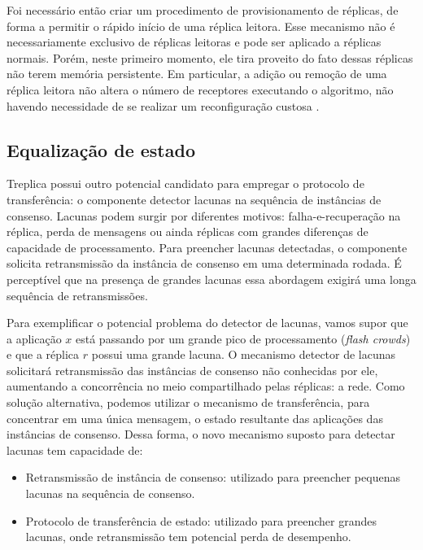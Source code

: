 Foi necessário então criar um procedimento de provisionamento de réplicas, de forma a
permitir o rápido início de uma réplica leitora. Esse mecanismo não é necessariamente
exclusivo de réplicas leitoras e pode ser aplicado a réplicas normais. Porém, neste
primeiro momento, ele tira proveito do fato dessas réplicas não terem memória persistente.
Em particular, a adição ou remoção de uma réplica leitora não altera o número de
receptores executando o algoritmo, não havendo necessidade de se realizar um
reconfiguração custosa \cite{lamport10}.

\subsection{Equalização de estado}

Treplica possui outro potencial candidato para empregar o protocolo de transferência: o
componente detector lacunas na sequência de instâncias de consenso. Lacunas podem surgir
por diferentes motivos: falha-e-recuperação na réplica, perda de mensagens ou ainda
réplicas com grandes diferenças de capacidade de processamento. Para preencher lacunas
detectadas, o componente solicita retransmissão da instância de consenso em uma
determinada rodada. É perceptível que na presença de grandes lacunas essa abordagem
exigirá uma longa sequência de retransmissões.

Para exemplificar o potencial problema do detector de lacunas, vamos supor que a aplicação
$x$ está passando por um grande pico de processamento (\emph{flash crowds}) e que a
réplica $r$ possui uma grande lacuna. O mecanismo detector de lacunas solicitará
retransmissão das instâncias de consenso não conhecidas por ele, aumentando a concorrência
no meio compartilhado pelas réplicas: a rede. Como solução alternativa, podemos utilizar o
mecanismo de transferência, para concentrar em uma única mensagem, o estado resultante das
aplicações das instâncias de consenso. Dessa forma, o novo mecanismo suposto para detectar
lacunas tem capacidade de:

\begin{itemize}
  \item Retransmissão de instância de consenso: utilizado para preencher pequenas lacunas
    na sequência de consenso.
  \item Protocolo de transferência de estado: utilizado para preencher grandes lacunas,
    onde retransmissão tem potencial perda de desempenho.
\end{itemize}

